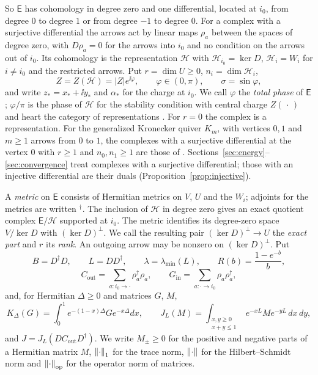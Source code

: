 So $\mathsf E$ has cohomology in degree zero and one differential, located
at $i_0$, from degree $0$ to degree $1$ or from degree $-1$ to degree $0$.
For a complex with a surjective differential the
arrows act by linear maps $\rho_a$ between the spaces of degree zero, with
$D\rho_a=0$ for the arrows into $i_0$ and no condition on the arrows out of
$i_0$. Its cohomology is the representation $\mathcal H$ with
$\mathcal H_{i_0}=\ker D$, $\mathcal H_i=W_i$ for $i\neq i_0$ and the
restricted arrows. Put $r=\dim U\geq0$, $n_i=\dim\mathcal H_i$,
\[
 Z=Z(\mathcal H)=|Z|e^{\ii\varphi},\qquad\varphi\in(0,\pi),\qquad\sigma=\sin\varphi ,
\]
and write $z_\ast=x_\ast+\ii y_\ast$ and $\alpha_\ast$ for the charge at
$i_0$. We call $\varphi$ the \emph{total phase} of $\mathsf E$; $\varphi/\pi$
is the phase of $\mathcal H$ for the stability condition with central charge
$Z(\,\cdot\,)$ and heart the category of representations
\cite[Propositions~2.4 and~5.3]{bri07}. For
$r=0$ the complex is a representation. For the generalized Kronecker quiver
$K_m$, with vertices $0,1$ and $m\geq1$ arrows from $0$ to $1$, the complexes
with a surjective differential at the vertex $0$ with $r\geq1$ and
$n_0,n_1\geq1$ are those of \cite{wue26a,wue26b}.
Sections~\ref{sec:energy}--\ref{sec:convergence} treat complexes with a
surjective differential; those with an injective differential are their
duals (Proposition~\ref{prop:injective}).

A \emph{metric} on $\mathsf E$ consists of Hermitian metrics on $V$, $U$ and
the $W_i$; adjoints for the metrics are written ${}^\dagger$. The inclusion
of $\mathcal H$ in degree zero gives an exact quotient complex
$\mathsf E/\mathcal H$ supported at $i_0$. The metric identifies its
degree-zero space $V/\ker D$ with $(\ker D)^\perp$. We call the resulting
pair $(\ker D)^\perp\to U$ the \emph{exact part} and $r$ its \emph{rank}.
An outgoing arrow may be nonzero on $(\ker D)^\perp$. Put
\[
 B=D^\dagger D,\qquad L=DD^\dagger,\qquad\lambda=\lambda_{\min}(L),\qquad
 R(b)=\frac{1-e^{-b}}b,
\]
\[
 C_{\mathrm{out}}=\sum_{a:i_0\to\cdot}\rho_a^\dagger\rho_a,\qquad
 G_{\mathrm{in}}=\sum_{a:\cdot\to i_0}\rho_a\rho_a^\dagger,
\]
and, for Hermitian $\Delta\geq0$ and matrices $G$, $M$,
\[
 K_\Delta(G)=\int_0^1e^{-(1-x)\Delta}Ge^{-x\Delta}dx,\qquad
 J_L(M)=\int_{\substack{x,y\geq0\\x+y\leq1}}e^{-xL}Me^{-yL}\,dx\,dy,
\]
and $J=J_L(DC_{\mathrm{out}}D^\dagger)$. We write $M_\pm\geq0$ for the positive
and negative parts of a Hermitian matrix $M$, $\left\lVert\cdot\right\rVert_1$ for the trace
norm, $\left\lVert\cdot\right\rVert$ for the Hilbert--Schmidt norm and
$\left\lVert\cdot\right\rVert_{\mathrm{op}}$ for the operator norm of matrices.

